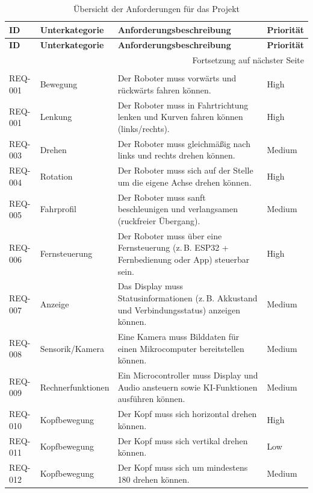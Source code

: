 \begin{longtable}{|p{1.7cm}|p{4.2cm}|p{8.8cm}|p{1.9cm}|}


	\caption{Übersicht der Anforderungen für das Projekt}
	\label{tab:anforderungen_ueberarbeitet} \\
	\hline
	\textbf{ID} & \textbf{Unterkategorie} & \textbf{Anforderungsbeschreibung} & \textbf{Priorität} \\
	\hline
	\endfirsthead
	
	\hline
	\textbf{ID} & \textbf{Unterkategorie} & \textbf{Anforderungsbeschreibung} & \textbf{Priorität} \\
	\hline
	\endhead
	
	\hline
	\multicolumn{4}{r}{Fortsetzung auf nächster Seite} \\
	\endfoot
	
	\hline
	\endlastfoot
	
	\multicolumn{4}{|l|}{\textbf{Funktionale Anforderungen}} \\
	\hline
	REQ-001 & Bewegung & Der Roboter muss vorwärts und rückwärts fahren können. & High \\
	\hline
	REQ-001 & Lenkung & Der Roboter muss in Fahrtrichtung lenken und Kurven fahren können (links/rechts). & High \\
	\hline
	REQ-003 & Drehen & Der Roboter muss gleichmäßig nach links und rechts drehen können. & Medium \\
	\hline
	REQ-004 & Rotation & Der Roboter muss sich auf der Stelle um die eigene Achse drehen können. & High \\
	\hline
	REQ-005 & Fahrprofil & Der Roboter muss sanft beschleunigen und verlangsamen (ruckfreier Übergang). & Medium \\
	\hline
	REQ-006 & Fernsteuerung & Der Roboter muss über eine Fernsteuerung (z.\,B. ESP32 + Fernbedienung oder App) steuerbar sein. & High \\
	\hline
	REQ-007 & Anzeige & Das Display muss Statusinformationen (z.\,B. Akkustand und Verbindungsstatus) anzeigen können. & Medium \\
	\hline
	REQ-008 & Sensorik/Kamera & Eine Kamera muss Bilddaten für einen Mikrocomputer bereitstellen können. & Medium \\
	\hline
	REQ-009 & Rechnerfunktionen & Ein Microcontroller muss Display und Audio ansteuern sowie KI-Funktionen ausführen können. & Medium \\
	\hline
	REQ-010 & Kopfbewegung & Der Kopf muss sich horizontal drehen können. & High \\
	\hline
	REQ-011 & Kopfbewegung & Der Kopf muss sich vertikal drehen können. & Low \\
	\hline
	REQ-012 & Kopfbewegung & Der Kopf muss sich um mindestens 180\textdegree{} drehen können. & Medium \\
	\hline
	

\end{longtable}
